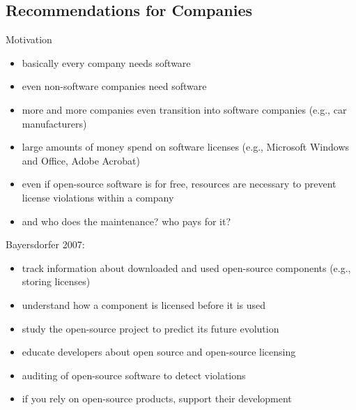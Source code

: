 
\subsection{Recommendations for Companies}
\begin{frame}{\insertsubsection}
	\begin{fancycolumns}
		\begin{note}{Motivation}
			\begin{itemize}
				\item basically every company needs software
				\item even non-software companies need software
				\item more and more companies even transition into software companies (e.g., car manufacturers)
				\item large amounts of money spend on software licenses (e.g., Microsoft Windows and Office, Adobe Acrobat)
				\item even if open-source software is for free, resources are necessary to prevent license violations within a company
				\item and who does the maintenance? who pays for it?
			\end{itemize}
		\end{note}
		\nextcolumn
		\begin{definition}{Bayersdorfer 2007: \mysource{\sommerville}}
			\begin{itemize}
				\item track information about downloaded and used open-source components (e.g., storing licenses)
				\item understand how a component is licensed before it is used
				\item study the open-source project to predict its future evolution
				\item educate developers about open source and open-source licensing \correct
				\item auditing of open-source software to detect violations
				\item if you rely on open-source products, support their development
			\end{itemize}
		\end{definition}
	\end{fancycolumns}
\end{frame}
